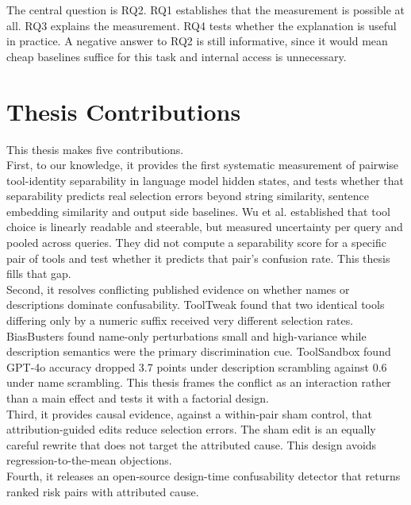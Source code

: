 The central question is RQ2.
RQ1 establishes that the measurement is possible at all.
RQ3 explains the measurement.
RQ4 tests whether the explanation is useful in practice.
A negative answer to RQ2 is still informative, since it would mean cheap baselines suffice for this task and internal access is unnecessary.

\section{Thesis Contributions}
This thesis makes five contributions. \\

First, to our knowledge, it provides the first systematic measurement of pairwise tool-identity separability in language model hidden states, and tests whether that separability predicts real selection errors beyond string similarity, sentence embedding similarity and output side baselines.
Wu et al. \cite{wu2026linearly} established that tool choice is linearly readable and steerable, but measured uncertainty per query and pooled across queries.
They did not compute a separability score for a specific pair of tools and test whether it predicts that pair's confusion rate.
This thesis fills that gap. \\

Second, it resolves conflicting published evidence on whether names or descriptions dominate confusability.
ToolTweak \cite{sneh2025tooltweak} found that two identical tools differing only by a numeric suffix received very different selection rates.
BiasBusters \cite{blankenstein2025biasbusters} found name-only perturbations small and high-variance while description semantics were the primary discrimination cue.
ToolSandbox \cite{lu2024toolsandbox} found GPT-4o accuracy dropped 3.7 points under description scrambling against 0.6 under name scrambling.
This thesis frames the conflict as an interaction rather than a main effect and tests it with a factorial design. \\

Third, it provides causal evidence, against a within-pair sham control, that attribution-guided edits reduce selection errors. The sham edit is an equally careful rewrite that does not target the attributed cause. This design avoids regression-to-the-mean objections. \\

Fourth, it releases an open-source design-time confusability detector that returns ranked risk pairs with attributed cause. \\

